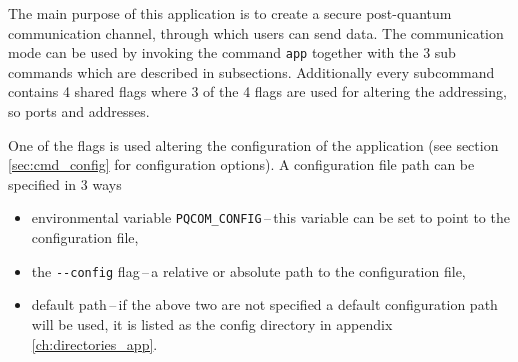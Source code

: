 The main purpose of this application is to create a secure post-quantum communication channel, through which users can send data. The communication mode can be used by invoking the command \texttt{app} together with the 3 sub commands which are described in subsections. Additionally every subcommand contains 4 shared flags where 3 of the 4 flags are used for altering the addressing, so ports and addresses.

One of the flags is used altering the configuration of the application (see section \ref{sec:cmd_config} for configuration options). A configuration file path can be specified in 3 ways
\newpage
\begin{itemize}
  \item environmental variable \texttt{PQCOM\_CONFIG}\,--\,this variable can be set to point to the configuration file,
  \item the \texttt{-\--config} flag\,--\,a relative or absolute path to the configuration file,
  \item default path\,--\,if the above two are not specified a default configuration path will be used, it is listed as the config directory in appendix \ref{ch:directories_app}.
\end{itemize}
